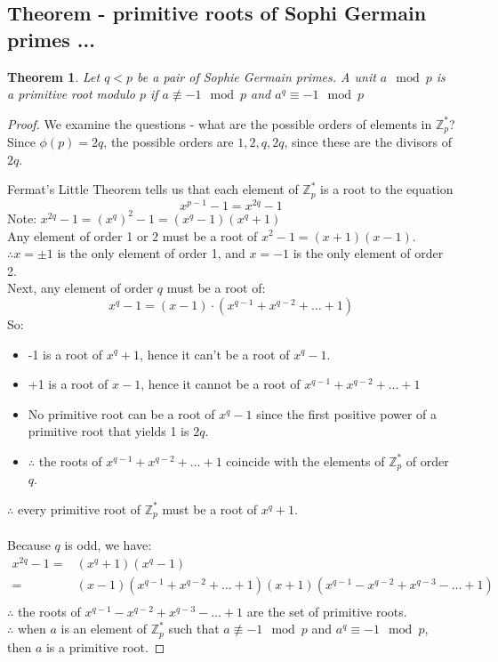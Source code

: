 \documentclass[10pt]{article}
\newcommand{\Z}{\mathbb{Z}}
\newtheorem{theorem}{Theorem}
\theoremstyle{definition}
\theoremstyle{remark}
\def\Z{\mathbb{ Z}}
\begin{document}
\subsection{Theorem - primitive roots of Sophi Germain primes ...}
\begin{theorem}
Let $q<p$ be a pair of Sophie Germain primes.  A unit $a \mod p$ is a primitive root modulo $p$ if $a \not \equiv -1 \mod p$ and $a^q \equiv -1 \mod p$
\end{theorem}
\begin{proof}
We examine the questions - what are the possible orders of elements in $\Z_p^*$?  Since $\phi(p) = 2q$, the possible orders are $1, 2, q, 2q$, since these are the divisors of $2q$.

Fermat's Little Theorem tells us that each element of $\Z_p^*$ is a root to the equation $$x^{p-1}-1 = x^{2q}-1$$
Note: $x^{2q}-1 = (x^q)^2-1 = (x^q-1)(x^q+1)$\\
Any element of order 1 or 2 must be a root of $x^2-1 = (x+1)(x-1)$. $\therefore x = \pm 1$ is the only element of order 1, and $x=-1$ is the only element of order 2.\\
Next, any element of order $q$ must be a root of: 
$$x^q-1 = (x-1) \cdot(x^{q-1}+x^{q-2}+\ldots+1)$$
So:
\begin{itemize}
\item -1 is a root of $x^q+1$, hence it can't be a root of $x^q-1$.
\item +1 is a root of $x-1$, hence it cannot be a root of $x^{q-1}+x^{q-2}+\ldots+1$
\item No primitive root can be a root of $x^q-1$ since the first positive power of a primitive root that yields 1 is $2q$.
\item $\therefore$ the roots of $x^{q-1}+x^{q-2}+\ldots+1$ coincide with the elements of $\Z_p^*$ of order $q$.
\end{itemize}
$\therefore$ every primitive root of $\Z_p^*$ must be a root of $x^q+1$.\\
\\
Because $q$ is odd, we have:
\begin{align*}
x^{2q}-1 =& (x^q+1)(x^q-1)\\
=& (x-1)(x^{q-1}+x^{q-2}+\ldots+1)(x+1)(x^{q-1}-x^{q-2}+x^{q-3}-\ldots+1)\\
\end{align*}
$\therefore$ the roots of $x^{q-1}-x^{q-2}+x^{q-3}-\ldots+1$ are the set of primitive roots.\\
$\therefore$ when $a$ is an element of $\Z_p^*$ such that $a \not \equiv -1 \mod p$ and $a^q \equiv -1 \mod p$, then $a$ is a primitive root.
\end{proof}
\end{document}
